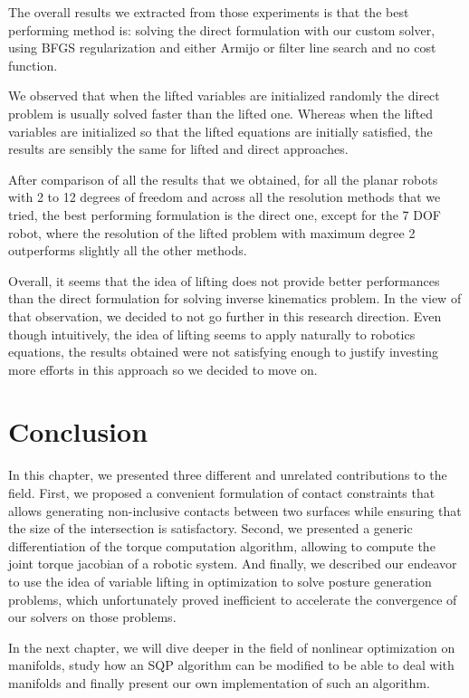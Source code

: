 The overall results we extracted from those experiments is that the best performing method is: solving the direct formulation with our custom solver, using BFGS regularization and either Armijo or filter line search and no cost function.

We observed that when the lifted variables are initialized randomly the direct problem is usually solved faster than the lifted one.
Whereas when the lifted variables are initialized so that the lifted equations are initially satisfied, the results are sensibly the same for lifted and direct approaches.

After comparison of all the results that we obtained, for all the planar robots with 2 to 12 degrees of freedom and across all the resolution methods that we tried, the best performing formulation is the direct one, except for the 7 DOF robot, where the resolution of the lifted problem with maximum degree 2 outperforms slightly all the other methods.

Overall, it seems that the idea of lifting does not provide better performances than the direct formulation for solving inverse kinematics problem.
In the view of that observation, we decided to not go further in this research direction.
Even though intuitively, the idea of lifting seems to apply naturally to robotics equations, the results obtained were not satisfying enough to justify investing more efforts in this approach so we decided to move on.

\section{Conclusion}
\label{sec:chap3_conclusion}

In this chapter, we presented three different and unrelated contributions to the field.
First, we proposed a convenient formulation of contact constraints that allows generating non-inclusive contacts between two surfaces while ensuring that the size of the intersection is satisfactory.
Second, we presented a generic differentiation of the torque computation algorithm, allowing to compute the joint torque jacobian of a robotic system.
And finally, we described our endeavor to use the idea of variable lifting in optimization to solve posture generation problems, which unfortunately proved inefficient to accelerate the convergence of our solvers on those problems.

In the next chapter, we will dive deeper in the field of nonlinear optimization on manifolds, study how an SQP algorithm can be modified to be able to deal with manifolds and finally present our own implementation of such an algorithm.
